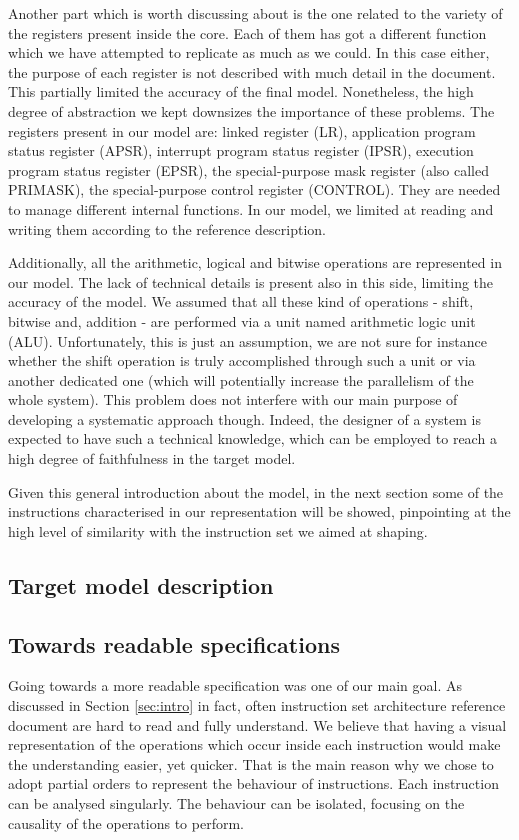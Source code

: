 \documentclass[conference]{IEEEtran}
\begin{document}
Another part which is worth discussing about is the one related to the variety of the
registers present inside the core. Each of them has got a different function which we have
attempted to replicate as much as we could. In this case either, the purpose of each register
is not described with much detail in the document. This partially limited the accuracy of the
final model. Nonetheless, the high degree of abstraction we kept downsizes the importance of
these problems. The registers present in our model are: linked register (LR), application
program status register (APSR), interrupt program status register (IPSR), execution program
status register (EPSR), the special-purpose mask register (also called PRIMASK), the special-purpose control register (CONTROL). They are needed to manage different internal functions.
In our model, we limited at reading and writing them according to the reference description.

Additionally, all the arithmetic, logical and bitwise operations are represented in our
model. The lack of technical details is present also in this side, limiting the accuracy of
the model. We assumed that all these kind of operations - shift, bitwise and, addition - are
performed via a unit named arithmetic logic unit (ALU). Unfortunately, this is just an
assumption, we are not sure for instance whether the shift operation is truly accomplished
through such a unit or via another dedicated one (which will potentially increase the
parallelism of the whole system). This problem does not interfere with our main purpose of
developing a systematic approach though. Indeed, the designer of a system is expected to have
such a technical knowledge, which can be employed to reach a high degree of faithfulness in
the target model.

Given this general introduction about the model, in the next section some of the instructions characterised in our representation will be showed, pinpointing at the high level of similarity with the instruction set we aimed at shaping.

\subsection{Target model description}

\subsection{Towards readable specifications}
Going towards a more readable specification was one of our main goal. As discussed in Section
\ref{sec:intro} in fact, often instruction set architecture reference document are hard to
read and fully understand. We believe that having a visual representation of the operations
which occur inside each instruction would make the understanding easier, yet quicker. That is
the main reason why we chose to adopt partial orders to represent the behaviour of
instructions. Each instruction can be analysed singularly. The behaviour can be isolated,
focusing on the causality of the operations to perform.
\end{document}

